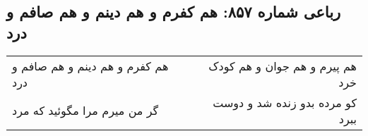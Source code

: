\begin{center}
\section*{رباعی شماره ۸۵۷: هم کفرم و هم دینم و هم صافم و درد}
\label{sec:0857}
\begin{longtable}{l p{0.5cm} r}
هم کفرم و هم دینم و هم صافم و درد
&&
هم پیرم و هم جوان و هم کودک خرد
\\
گر من میرم مرا مگوئید که مرد
&&
کو مرده بدو زنده شد و دوست ببرد
\\
\end{longtable}
\end{center}
